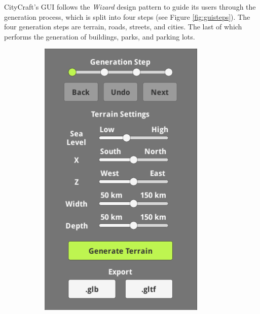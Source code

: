 CityCraft's GUI follows the \textit{Wizard} design pattern to guide its users through the generation process, which is split into four steps (see Figure \ref{fig:guisteps}).
The four generation steps are terrain, roads, streets, and cities.
The last of which performs the generation of buildings, parks, and parking lots. 

\begin{figure}[H]
  \centering
  \begin{subfigure}[b]{0.24\textwidth}
    \includegraphics[width=\textwidth]{figure/results/gui1.png}

\end{subfigure}
\end{figure}
